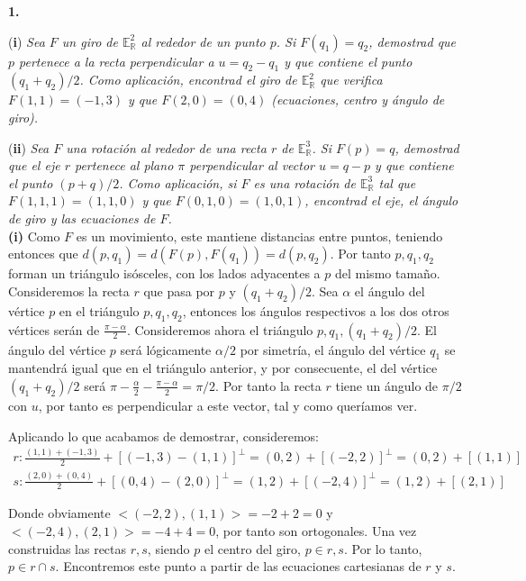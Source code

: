 \textbf{1. }

(\textbf{i}) \textit{Sea $F$ un giro de $\mathbb{E}^{2}_{\mathbb{R}}$ al rededor de un punto $p$. Si $F(q_1) = q_2$, demostrad que $p$ pertenece a la recta perpendicular a $u = q_2 - q_1$ y que contiene el punto $(q_1 + q_2)/2$. Como aplicación, encontrad el giro de $\mathbb{E}^{2}_{\mathbb{R}}$ que verifica $F(1,1) = (-1,3)$ y que $F(2,0) = (0,4)$ (ecuaciones, centro y ángulo de giro).}

(\textbf{ii}) \textit{Sea $F$ una rotación al rededor de una recta $r$ de $\mathbb{E}^{3}_{\mathbb{R}}$. Si $F(p) = q$, demostrad que el eje $r$ pertenece al plano $\pi$ perpendicular al vector $u = q - p$ y que contiene el punto $(p + q)/2$. Como aplicación, si $F$ es una rotación de $\mathbb{E}^{3}_{\mathbb{R}}$ tal que $F(1,1,1) = (1,1,0)$ y que $F(0,1,0) = (1,0,1)$, encontrad el eje, el ángulo de giro y las ecuaciones de $F$.}
\\

\hspace*{10mm} \textbf{(i) } Como $F$ es un movimiento, este mantiene distancias entre puntos, teniendo entonces que $d(p,q_1) = d(F(p),F(q_1)) = d(p,q_2)$. Por tanto $p,q_1,q_2$ forman un triángulo isósceles, con los lados adyacentes a $p$ del mismo tamaño. Consideremos la recta $r$ que pasa por $p$ y $(q_1+q_2)/2$. Sea $\alpha$ el ángulo del vértice $p$ en el triángulo $p,q_1,q_2$, entonces los ángulos respectivos a los dos otros vértices serán de $\frac{\pi - \alpha}{2}$. Consideremos ahora el triángulo $p,q_1,(q_1+q_2)/2$. El ángulo del vértice $p$ será lógicamente $\alpha /2$ por simetría, el ángulo del vértice $q_1$ se mantendrá igual que en el triángulo anterior, y por consecuente, el del vértice $(q_1+q_2)/2$ será $\pi - \frac{\alpha}{2} - \frac{\pi - \alpha}{2} = \pi/2$. Por tanto la recta $r$ tiene un ángulo de $\pi/2$ con $u$, por tanto es perpendicular a este vector, tal y como queríamos ver.

Aplicando lo que acabamos de demostrar, consideremos:
\begin{gather*}
    r: \frac{(1,1) + (-1,3)}{2} + [(-1,3) - (1,1)]^{\perp} = (0,2) + [(-2,2)]^{\perp} =(0,2) + [(1,1)]\\
    s: \frac{(2,0) + (0,4)}{2} + [(0,4) - (2,0)]^{\perp} = (1,2) + [(-2,4)]^{\perp} = (1,2) + [(2,1)]
\end{gather*}

Donde obviamente $<(-2,2),(1,1)> = -2 + 2 = 0$ y $<(-2,4),(2,1)> = -4 + 4 = 0$, por tanto son ortogonales. Una vez construidas las rectas $r,s$, siendo $p$ el centro del giro, $p\in r,s$. Por lo tanto, $p\in r \cap s$. Encontremos este punto a partir de las ecuaciones cartesianas de $r$ y $s$.

